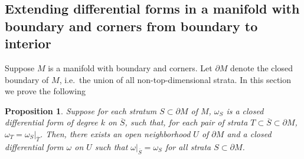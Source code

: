 \documentclass[11pt]{article}
\newtheorem{prp}[thm]{Proposition}
\theoremstyle{definition}
\theoremstyle{remark}
\def\ov#1{\overline{#1}}
\begin{document}
\begin{appendices}
\section{Extending differential forms in a manifold with boundary and corners from boundary to interior}

Suppose $M$ is a manifold with boundary and corners. Let $\partial M$ denote the closed boundary of $M$, i.e.~the union of all non-top-dimensional strata. 
In this section we prove the following 
\begin{prp}
Suppose for each stratum $S\subset\partial M$ of $M$, $\omega_S$ is a closed differential form of degree $k$ on $\ov{S}$, such that, for each pair of strata $T\subset \ov{S} \subset\partial{M}$, $\omega_T=\omega_S|_{\ov{T}}$. 
Then, there exists an open neighborhood $U$ of $\partial M$ and a closed differential form $\omega$ on $U$ such that $\omega|_{\ov{S}}=\omega_S$ for all strata $S\subset\partial M$. 
\end{prp}


\end{appendices}
\end{document}
